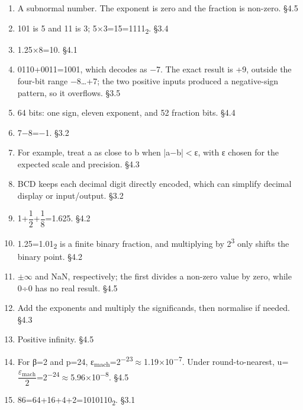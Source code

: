 \documentclass[11pt]{article}
\begin{document}
\begin{keepsection}
\begin{enumerate}
\item A subnormal number. The exponent is zero and the fraction is non-zero. \hfill{\small\color{FAUblue}§4.5}
\item 101 is 5 and 11 is 3; 5\ensuremath{\times}3=15=1111\textsubscript{2}. \hfill{\small\color{FAUblue}§3.4}
\item 1.25\ensuremath{\times}8=10. \hfill{\small\color{FAUblue}§4.1}
\item 0110+0011=1001, which decodes as \ensuremath{-}7. The exact result is +9, outside the four-bit range \ensuremath{-}8…+7; the two positive inputs produced a negative-sign pattern, so it overflows. \hfill{\small\color{FAUblue}§3.5}
\item 64 bits: one sign, eleven exponent, and 52 fraction bits. \hfill{\small\color{FAUblue}§4.4}
\item 7\ensuremath{-}8=\ensuremath{-}1. \hfill{\small\color{FAUblue}§3.2}
\item For example, treat a as close to b when |a\ensuremath{-}b|\ensuremath{<}ε, with ε chosen for the expected scale and precision. \hfill{\small\color{FAUblue}§4.3}
\item BCD keeps each decimal digit directly encoded, which can simplify decimal display or input/output. \hfill{\small\color{FAUblue}§3.2}
\item 1+{\small\ensuremath{\dfrac{1}{2}}}+{\small\ensuremath{\dfrac{1}{8}}}=1.625. \hfill{\small\color{FAUblue}§4.2}
\item 1.25=1.01\textsubscript{2} is a finite binary fraction, and multiplying by 2\textsuperscript{3} only shifts the binary point. \hfill{\small\color{FAUblue}§4.2}
\item \ensuremath{\pm}\ensuremath{\infty} and NaN, respectively; the first divides a non-zero value by zero, while 0÷0 has no real result. \hfill{\small\color{FAUblue}§4.5}
\item Add the exponents and multiply the significands, then normalise if needed. \hfill{\small\color{FAUblue}§4.3}
\item Positive infinity. \hfill{\small\color{FAUblue}§4.5}
\item For β=2 and p=24, ε\textsubscript{mach}=2\textsuperscript{\ensuremath{-}23}\ensuremath{\approx}1.19\ensuremath{\times}10\textsuperscript{\ensuremath{-}7}. Under round-to-nearest, u={\small\ensuremath{\dfrac{ε_{\text{mach}}}{2}}}=2\textsuperscript{\ensuremath{-}24}\ensuremath{\approx}5.96\ensuremath{\times}10\textsuperscript{\ensuremath{-}8}. \hfill{\small\color{FAUblue}§4.5}
\item 86=64+16+4+2=1010110\textsubscript{2}. \hfill{\small\color{FAUblue}§3.1}

\end{enumerate}
\end{keepsection}
\end{document}
